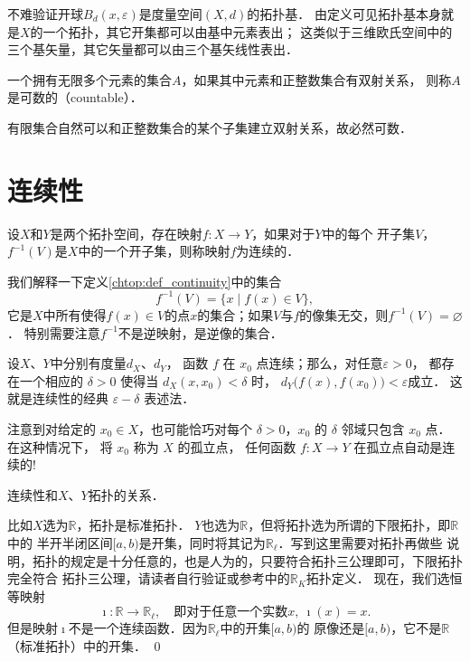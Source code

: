 不难验证开球$B_d(x,\varepsilon)$是度量空间$(X,d)$的拓扑基．
由定义可见拓扑基本身就是$X$的一个拓扑，其它开集都可以由基中元素表出；
这类似于三维欧氏空间中的三个基矢量，其它矢量都可以由三个基矢线性表出．

\begin{definition}
    一个拥有无限多个元素的集合$A$，如果其中元素和正整数集合有双射关系，
    则称$A$是{\heiti 可数的}（countable）．
\end{definition}
有限集合自然可以和正整数集合的某个子集建立双射关系，故必然可数．



\section{连续性}

\begin{definition}\label{chtop:def_continuity}
    设$X$和$Y$是两个拓扑空间，存在映射$f:X\to Y$，如果对于$Y$中的每个
    开子集$V$，$f^{-1}(V)$是$X$中的一个开子集，则称映射$f$为{\heiti 连续的}．
\end{definition}

我们解释一下定义\ref{chtop:def_continuity}中的集合
\begin{equation}
    f^{-1}(V)=\{x \mid  f(x) \in V\},
\end{equation}
它是$X$中所有使得$f(x)\in V$的点$x$的集合；如果$V$与$f$的像集无交，则$f^{-1}(V)=\varnothing$．
特别需要注意$f^{-1}$不是逆映射，是逆像的集合．

设$X$、$Y$中分别有度量$d_X$、$d_Y$，
函数 $f$ 在 $x_0$ 点连续；那么，对任意$\varepsilon>0$，
都存在一个相应的 $\delta>0$ 使得当 $d_X(x, x_0)<\delta$ 时，
$d_Y\bigl(f(x), f(x_0)\bigr)<\varepsilon $成立．
这就是连续性的经典 $\varepsilon-\delta$ 表述法．

注意到对给定的 $x_0 \in X$，也可能恰巧对每个 $\delta>0$，$ x_0$ 的 $\delta$ 邻域只包含 $x_0$ 点．
在这种情况下， 将 $x_0$ 称为 $X$ 的孤立点， 任何函数 $f: X \rightarrow Y$ 在孤立点自动是连续的!



\begin{example}\label{chtop:exm_txyr}
    连续性和$X$、$Y$拓扑的关系．
\end{example}
比如$X$选为$\mathbb{R}$，拓扑是{\kaishu 标准拓扑}．
$Y$也选为$\mathbb{R}$，但将拓扑选为所谓的{\kaishu 下限拓扑}，即$\mathbb{R}$中的
半开半闭区间$[a,b)$是开集，同时将其记为$\mathbb{R}_\ell$．写到这里需要对拓扑再做些
说明，拓扑的规定是十分任意的，也是人为的，只要符合拓扑三公理即可，下限拓扑完全符合
拓扑三公理，请读者自行验证或参考\parencite[\S 13]{munkres-2000-topology}中的$\mathbb{R}_K$拓扑定义．
现在，我们选恒等映射
\begin{equation}
    \imath : \mathbb{R} \to \mathbb{R}_\ell,\quad
    \text{即对于任意一个实数}x,\  \imath(x) =x .
\end{equation}
但是映射$\imath${\kaishu 不是}一个连续函数．因为$\mathbb{R}_\ell$中的开集$[a,b)$的
原像还是$[a,b)$，它不是$\mathbb{R}$（标准拓扑）中的开集． \qed

